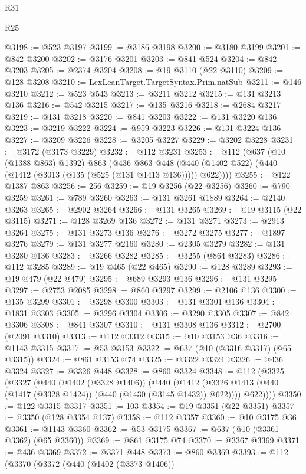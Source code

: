 \begin{lexlean}{R31}
\begin{lexlean}{R25}
\begin{coremodule}
{{{{{{{{{{{{{{{{{{{{{{{{{{{{{{{{{{{{{{{{{{{{{{{{{{{{{{{{{{{{{{{{{{{{{{{{{{{{{{{{{{{{{{{{{{{{{{{{{{{{{{{{{{{{{{{{{{{{{{{{{{{{{{{{{{{{{{{{{{{{{{{{{{{{{{{{{{{{{{{{{{{{{{{{{{{{{{{{{{{{{{{{{{{{{{{{{{{{{{{@3198 := @523 @3197
@3199 := @3186 @3198
@3200 := @3180 @3199
@3201 := @842 @3200
@3202 := @3176 @3201
@3203 := @841 @524
@3204 := @842 @3203
@3205 := @2374 @3204
@3208 := @19 @3110 (@22 @3110)
@3209 := @128 @3208
@3210 := LexLeanTarget.TargetSyntax.Prim.natSub
@3211 := @146 @3210
@3212 := @523 @543
@3213 := @3211 @3212
@3215 := @131 @3213 @136
@3216 := @542 @3215
@3217 := @135 @3216
@3218 := @2684 @3217
@3219 := @131 @3218
@3220 := @841 @3203
@3222 := @131 @3220 @136
@3223 := @3219 @3222
@3224 := @959 @3223
@3226 := @131 @3224 @136
@3227 := @3209 @3226
@3228 := @3205 @3227
@3229 := @3202 @3228
@3231 := @3172 (@3173 @3229)
@3232 := @112 @3231
@3253 := @112
    (@637
      (@10 (@1388 @863) @1392)
      @863
      (@436
        @863
        @448
        (@440 (@1402 @522) (@440 (@1412 (@3013 (@135 (@525 (@131 @1413 @136))))) @622))))
@3255 := @122 @1387 @863
@3256 := 256
@3259 := @19 @3256 (@22 @3256)
@3260 := @790 @3259
@3261 := @789 @3260
@3263 := @131 @3261 @1889
@3264 := @2140 @3263
@3265 := @2902 @3264
@3266 := @131 @3265
@3269 := @19 @3115 (@22 @3115)
@3271 := @128 @3269 @136
@3272 := @131 @3271
@3273 := @2913 @3264
@3275 := @131 @3273 @136
@3276 := @3272 @3275
@3277 := @1897 @3276
@3279 := @131 @3277 @2160
@3280 := @2305 @3279
@3282 := @131 @3280 @136
@3283 := @3266 @3282
@3285 := @3255 (@864 @3283)
@3286 := @112 @3285
@3289 := @19 @465 (@22 @465)
@3290 := @128 @3289
@3293 := @19 @479 (@22 @479)
@3295 := @689 @3293 @136
@3296 := @131 @3295
@3297 := @2753 @2085
@3298 := @860 @3297
@3299 := @2106 @136
@3300 := @135 @3299
@3301 := @3298 @3300
@3303 := @131 @3301 @136
@3304 := @1831 @3303
@3305 := @3296 @3304
@3306 := @3290 @3305
@3307 := @842 @3306
@3308 := @841 @3307
@3310 := @131 @3308 @136
@3312 := @2700 (@2091 @3310)
@3313 := @112 @3312
@3315 := @10 @3153 @36
@3316 := @1143 @3315
@3317 := @53 @3153
@3322 := @637 (@10 (@3316 @3317) (@65 @3315))
@3324 := @861 @3153 @74
@3325 := @3322 @3324
@3326 := @436 @3324
@3327 := @3326 @448
@3328 := @860 @3324
@3348 := @112
    (@3325
      (@3327
        (@440
          (@1402 (@3328 @1406))
          (@440
            (@1412 (@3326 @1413 (@440 (@1417 (@3328 @1424)) (@440 (@1430 (@3145 @1432)) @622))))
            @622))))
@3350 := @122 @3315 @3317
@3351 := 103
@3354 := @19 @3351 (@22 @3351)
@3357 := @3350 (@128 @3354 @137)
@3358 := @112 @3357
@3360 := @10 @3175 @36
@3361 := @1143 @3360
@3362 := @53 @3175
@3367 := @637 (@10 (@3361 @3362) (@65 @3360))
@3369 := @861 @3175 @74
@3370 := @3367 @3369
@3371 := @436 @3369
@3372 := @3371 @448
@3373 := @860 @3369
@3393 := @112
    (@3370
      (@3372
        (@440
          (@1402 (@3373 @1406))
}}}}}}}}}}}}}}}}}}}}}}}}}}}}}}}}}}}}}}}}}}}}}}}}}}}}}}}}}}}}}}}}}}}}}}}}}}}}}}}}}}}}}}}}}}}}}}}}}}}}}}}}}}}}}}}}}}}}}}}}}}}}}}}}}}}}}}}}}}}}}}}}}}}}}}}}}}}}}}}}}}}}}}}}}}}}}}}}}}}}}}}}}}}}}}}}}}}}}}}
\end{coremodule}
\end{lexlean}
\end{lexlean}
